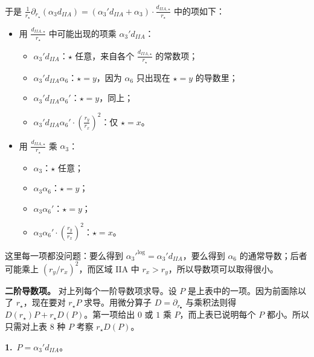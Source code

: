 于是 $\frac{1}{r_\star}\partial_{r_\star}(\alpha_3d_{IIA})=(\alpha_3'd_{IIA}+\alpha_3)\cdot\frac{d_{IIA,\star}}{r_\star}$ 中的项如下：
\begin{itemize}[leftmargin=2.2em,itemsep=0.2em]
\item 用 $\frac{d_{IIA,\star}}{r_\star}$ 中可能出现的项乘 $\alpha_3'd_{IIA}$：
 \begin{itemize}[leftmargin=1.8em,itemsep=0.15em]
 \item $\alpha_3'd_{IIA}$：$\star$ 任意，来自各个 $\frac{d_{IIA,\star}}{r_\star}$ 的常数项；
 \item $\alpha_3'd_{IIA}\alpha_6$：$\star=y$，因为 $\alpha_6$ 只出现在 $\star=y$ 的导数里；
 \item $\alpha_3'd_{IIA}\alpha_6'$：$\star=y$，同上；
 \item $\alpha_3'd_{IIA}\alpha_6'\cdot\left(\frac{r_y}{r_x}\right)^2$：仅 $\star=x$。
 \end{itemize}
\item 用 $\frac{d_{IIA,\star}}{r_\star}$ 乘 $\alpha_3$：
 \begin{itemize}[leftmargin=1.8em,itemsep=0.15em]
 \item $\alpha_3$：$\star$ 任意；
 \item $\alpha_3\alpha_6$：$\star=y$；
 \item $\alpha_3\alpha_6'$：$\star=y$；
 \item $\alpha_3\alpha_6'\cdot\left(\frac{r_y}{r_x}\right)^2$：$\star=x$。
 \end{itemize}
\end{itemize}

这里每一项都没问题：要么得到 ${\alpha_3'}^{\log}=\alpha_3'd_{IIA}$，要么得到 $\alpha_6$ 的通常导数；后者可能乘上 $(r_y/r_x)^2$，而区域 IIA 中 $r_x>r_y$，所以导数项可以取得很小。

\medskip
\noindent\textbf{二阶导数项。} 对上列每个一阶导数项求导。设 $P$ 是上表中的一项。因为前面除以了 $r_\star$，现在要对 $r_\star P$ 求导。用微分算子 $D=\partial_{r_\bullet}$ 与乘积法则得 $D(r_\star)P+r_\star D(P)$。第一项给出 $0$ 或 $1$ 乘 $P$，而上表已说明每个 $P$ 都小。所以只需对上表 8 种 $P$ 考察 $r_\star D(P)$。


\medskip
\noindent\textbf{1.}\ $P=\alpha_3'd_{IIA}$。

